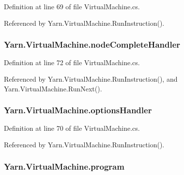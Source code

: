 Definition at line 69 of file Virtual\-Machine.\-cs.



Referenced by Yarn.\-Virtual\-Machine.\-Run\-Instruction().

\hypertarget{a00156_a5129c63e67e2d4e2780d86b8351320a2}{
\subsubsection[{node\-Complete\-Handler}]{ Yarn.\-Virtual\-Machine.\-node\-Complete\-Handler}}\label{a00156_a5129c63e67e2d4e2780d86b8351320a2}


Definition at line 72 of file Virtual\-Machine.\-cs.



Referenced by Yarn.\-Virtual\-Machine.\-Run\-Instruction(), and Yarn.\-Virtual\-Machine.\-Run\-Next().

\hypertarget{a00156_acd25fe2e3aa90dc87ba25d9af904465b}{
\subsubsection[{options\-Handler}]{ Yarn.\-Virtual\-Machine.\-options\-Handler}}\label{a00156_acd25fe2e3aa90dc87ba25d9af904465b}


Definition at line 70 of file Virtual\-Machine.\-cs.



Referenced by Yarn.\-Virtual\-Machine.\-Run\-Instruction().

\hypertarget{a00156_a2695dbfe3d9df7ffa3f13ad2231217fb}{
\subsubsection[{program}]{ Yarn.\-Virtual\-Machine.\-program\hspace{0.3cm}{\ttfamily [private]}}}\label{a00156_a2695dbfe3d9df7ffa3f13ad2231217fb}


